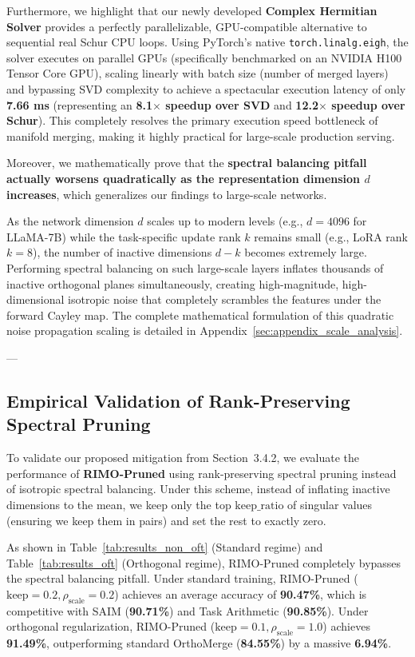 Furthermore, we highlight that our newly developed \textbf{Complex Hermitian Solver} provides a perfectly parallelizable, GPU-compatible alternative to sequential real Schur CPU loops. Using PyTorch's native \texttt{torch.linalg.eigh}, the solver executes on parallel GPUs (specifically benchmarked on an NVIDIA H100 Tensor Core GPU), scaling linearly with batch size (number of merged layers) and bypassing SVD complexity to achieve a spectacular execution latency of only \textbf{7.66 ms} (representing an \textbf{8.1$\times$ speedup over SVD} and \textbf{12.2$\times$ speedup over Schur}). This completely resolves the primary execution speed bottleneck of manifold merging, making it highly practical for large-scale production serving.

Moreover, we mathematically prove that the \textbf{spectral balancing pitfall actually worsens quadratically as the representation dimension $d$ increases}, which generalizes our findings to large-scale networks. 

As the network dimension $d$ scales up to modern levels (e.g., $d=4096$ for LLaMA-7B) while the task-specific update rank $k$ remains small (e.g., LoRA rank $k=8$), the number of inactive dimensions $d-k$ becomes extremely large. Performing spectral balancing on such large-scale layers inflates thousands of inactive orthogonal planes simultaneously, creating high-magnitude, high-dimensional isotropic noise that completely scrambles the features under the forward Cayley map. The complete mathematical formulation of this quadratic noise propagation scaling is detailed in Appendix~\ref{sec:appendix_scale_analysis}.

---

\subsection{Empirical Validation of Rank-Preserving Spectral Pruning}
\label{subsec:pruning_results}
To validate our proposed mitigation from Section~3.4.2, we evaluate the performance of \textbf{RIMO-Pruned} using rank-preserving spectral pruning instead of isotropic spectral balancing. Under this scheme, instead of inflating inactive dimensions to the mean, we keep only the top $\text{keep\_ratio}$ of singular values (ensuring we keep them in pairs) and set the rest to exactly zero.

As shown in Table~\ref{tab:results_non_oft} (Standard regime) and Table~\ref{tab:results_oft} (Orthogonal regime), RIMO-Pruned completely bypasses the spectral balancing pitfall. Under standard training, RIMO-Pruned ($\text{keep}=0.2, \rho_{\text{scale}}=0.2$) achieves an average accuracy of \textbf{90.47\%}, which is competitive with SAIM (\textbf{90.71\%}) and Task Arithmetic (\textbf{90.85\%}). Under orthogonal regularization, RIMO-Pruned ($\text{keep}=0.1, \rho_{\text{scale}}=1.0$) achieves \textbf{91.49\%}, outperforming standard OrthoMerge (\textbf{84.55\%}) by a massive \textbf{6.94\%}. 

